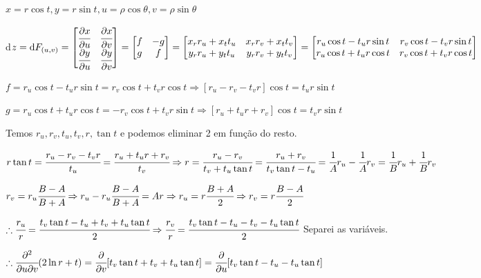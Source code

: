 \documentclass[10pt,a4paper]{article}
\begin{document}
		\vspace{3mm}

		$x = r \cos t, y = r \sin t, u = \rho \cos \theta, v = \rho \sin \theta$

		d$z = \mathrm{d}F_{(u,v)} = \left[ \begin{matrix} \cfrac{\partial x}{\partial u} & \cfrac{\partial x}{\partial v} \\ \cfrac{\partial y}{\partial u} & \cfrac{\partial y}{\partial v} \end{matrix} \right] = \left[ \begin{matrix} f & -g \\ g & f \end{matrix} \right] = \left[ \begin{matrix} x_r r_u + x_t t_u & x_r r_v + x_t t_v \\ y_r r_u + y_t t_u & y_r r_v + y_t t_v \end{matrix} \right] = \left[ \begin{matrix} r_u \cos t - t_u r \sin t & r_v \cos t - t_v r \sin t \\ r_u \cos t + t_u r \cos t & r_v \cos t + t_v r \cos t \end{matrix} \right]$

		$f = r_u \cos t - t_u r \sin t = r_v \cos t + t_v r \cos t \Rightarrow [r_u - r_v - t_v r] \cos t = t_u r \sin t$

		$g = r_u \cos t + t_u r \cos t = - r_v \cos t + t_v r \sin t \Rightarrow [r_u + t_u r + r_v] \cos t = t_v r \sin t$

		Temos $r_u, r_v, t_u, t_v, r, \tan t$ e podemos eliminar 2 em fun\c{c}\~ao do resto.

		$r \tan t = \cfrac{r_u - r_v - t_v r}{t_u} = \cfrac{r_u + t_u r + r_v}{t_v} \Rightarrow r = \cfrac{r_u - r_v}{t_v + t_u \tan t} = \cfrac{r_u + r_v}{t_v \tan t - t_u} = \cfrac{1}{A} r_u - \cfrac{1}{A} r_v = \cfrac{1}{B} r_u + \cfrac{1}{B} r_v $

		$r_v = r_u \cfrac{B - A}{B + A} \Rightarrow r_u - r_u \cfrac{B - A}{B + A} = Ar \Rightarrow r_u = r \cfrac{B + A}{2} \Rightarrow r_v =  r \cfrac{B - A}{2}$

		$\therefore \cfrac{r_u}{r} = \cfrac{t_v \tan t - t_u + t_v + t_u \tan t}{2} \Rightarrow \cfrac{r_v}{r} =  \cfrac{t_v \tan t - t_u - t_v - t_u \tan t}{2}$ Separei as vari\'aveis.

		$\therefore \cfrac{\partial^2}{\partial u \partial v} (2 \ln r + t) = \cfrac{\partial}{\partial v} [t_v \tan t + t_v + t_u \tan t] = \cfrac{\partial}{\partial u} [t_v \tan t - t_u - t_u \tan t]$
\end{document}
